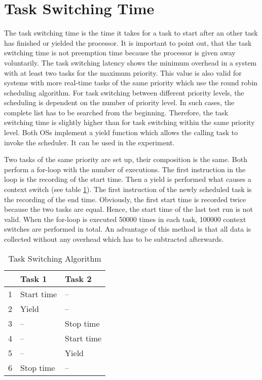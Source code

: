 \section{Task Switching Time} 
The task switching time is the time it takes for a task to start after an other task has finished or yielded the processor.
It is important to point out, that the task switching time is not preemption time because the processor is given away voluntarily.
The task switching latency shows the minimum overhead in a system with at least two tasks for the maximum priority. 
This value is also valid for systems with more real-time tasks of the same priority which use the round robin scheduling algorithm.
For task switching between different priority levels, the scheduling is dependent on the number of priority level.
In such cases, the complete list has to be searched from the beginning.
Therefore, the task switching time is slightly higher than for task switching within the same priority level.
Both \acp{OS} implement a yield function which allows the calling task to invoke the scheduler.
It can be used in the experiment.
\par
Two tasks of the same priority are set up, their composition is the same. 
Both perform a for-loop with the number of executions.
The first instruction in the loop is the recording of the start time.
Then a yield is performed what causes a context switch (see table \ref{tab_task_switching}). 
The first instruction of the newly scheduled task is the recording of the end time.
Obviously, the first start time is recorded twice because the two tasks are equal.
Hence, the start time of the last test run is not valid.
When the for-loop is executed 50000 times in each task, 100000 context switches are performed in total.
An advantage of this method is that all data is collected without any overhead which has to be subtracted afterwards.

\begin{table}[htbp]
	\centering
		\begin{tabular}{|l|l|l|}
			\hline
				& Task 1							& Task 2						\\
				\hline 
			  1 & Start time					& --								\\
			  2 & Yield								& --								\\
			  3 & --									& Stop time					\\ 
			  4 & --									& Start time				\\
			  5 & --									& Yield							\\
			  6 & Stop time						& --								\\ 			  
			\hline
		\end{tabular}
	\caption{Task Switching Algorithm}
	\label{tab_task_switching}
\end{table}
 
